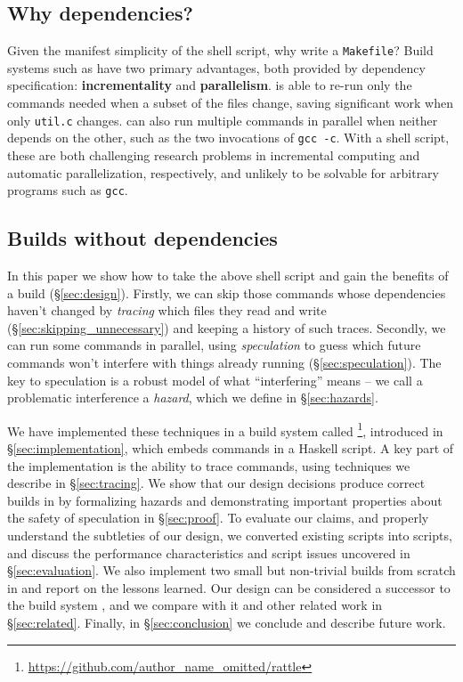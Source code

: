 \subsection{Why dependencies?}

Given the manifest simplicity of the shell script, why write a \texttt{Makefile}? Build systems such as \Make have two primary advantages, both provided by dependency specification: \textbf{incrementality} and \textbf{parallelism}. \Make is able to re-run only the commands needed when a subset of the files change, saving significant work when only \texttt{util.c} changes. \Make can also run multiple commands in parallel when neither depends on the other, such as the two invocations of \texttt{gcc -c}. With a shell script, these are both challenging research problems in incremental computing and automatic parallelization, respectively, and unlikely to be solvable for arbitrary programs such as \texttt{gcc}.

\subsection{Builds without dependencies}

In this paper we show how to take the above shell script and gain the benefits of a \Make build (\S\ref{sec:design}). Firstly, we can skip those commands whose dependencies haven't changed by \emph{tracing} which files they read and write (\S\ref{sec:skipping_unnecessary}) and keeping a history of such traces. Secondly, we can run some commands in parallel, using \emph{speculation} to guess which future commands won't interfere with things already running (\S\ref{sec:speculation}). The key to speculation is a robust model of what ``interfering'' means -- we call a problematic interference a \emph{hazard}, which we define  in \S\ref{sec:hazards}.

We have implemented these techniques in a build system called \Rattle\footnote{\url{https://github.com/author_name_omitted/rattle}}, introduced in \S\ref{sec:implementation}, which embeds commands in a Haskell script. A key part of the implementation is the ability to trace commands, using techniques we describe in \S\ref{sec:tracing}. We show that our design decisions produce correct builds in by formalizing hazards and demonstrating important properties about the safety of speculation in \S\ref{sec:proof}. To evaluate our claims, and properly understand the subtleties of our design, we converted existing \Make scripts into \Rattle scripts, and discuss the performance characteristics and \Make script issues uncovered in \S\ref{sec:evaluation}. We also implement two small but non-trivial builds from scratch in \Rattle and report on the lessons learned. Our design can be considered a successor to the \Memoize build system \cite{memoize}, and we compare \Rattle with it and other related work in \S\ref{sec:related}. Finally, in \S\ref{sec:conclusion} we conclude and describe future work.
